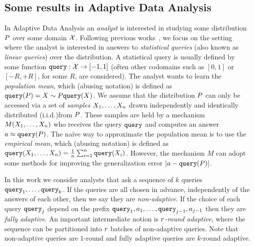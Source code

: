 \subsection{Some results in Adaptive Data Analysis}
In Adaptive Data Analysis an \emph{analyst} is interested in studying some distribution $P$ over some domain $\mathcal{X}$.  Following previous works~\cite{DworkFHPRR15,HardtU14,BassilyNSSSU16}, we focus on the setting where the analyst is interested in answers to \emph{statistical queries} (also known as \emph{linear queries}) over the distribution.  A statistical query is usually defined by some function ${\tt query} : \mathcal{X} \to [-1,1]$ (often other codomains such as $[0,1]$ or $[-R,+R]$, for some $R$, are considered).  The analyst wants to learn the \emph{population mean}, which (abusing notation) is defined as 
${\tt query}(P) = {X \sim P}{{\tt query}(X)}$. 
%
We assume that the distribution $P$ can only be accessed via a set of \emph{samples} $X_1,\dots,X_n$ drawn independently and identically distributed (i.i.d.)from $P$.  These samples are held by a mechanism $M(X_1,\dots,X_n)$ who receives the query ${\tt query}$ and computes an answer 
$a \approx {\tt query}(P)$.
%
The na\"ive way to approximate the population mean is to use the \emph{empirical mean}, which (abusing notation) is defined as 
${\tt query}(X_1,\dots,X_n) = \frac{1}{n} \sum_{i=1}^{n} {\tt query}(X_i)$.
However, the mechanism $M$ can adopt some methods for improving the generalization error $| a- {\tt query}(P)|$.

In this work we consider analysts that ask a sequence of $k$ queries ${\tt query}_1,\dots,{\tt query}_k$.  If the queries are all chosen in advance, independently of the answers of each other, then we say they are \emph{non-adaptive}.  If the choice of each query ${\tt query}_j$ depend on the prefix ${\tt query}_1,a_1,\dots,{\tt query}_{j-1},a_{j-1}$ then they are \emph{fully adaptive}.  An important intermediate notion is \emph{$r$-round adaptive}, where the sequence can be partitioned into $r$ batches of non-adaptive queries.  Note that non-adaptive queries are $1$-round and fully adaptive queries are $k$-round adaptive.

